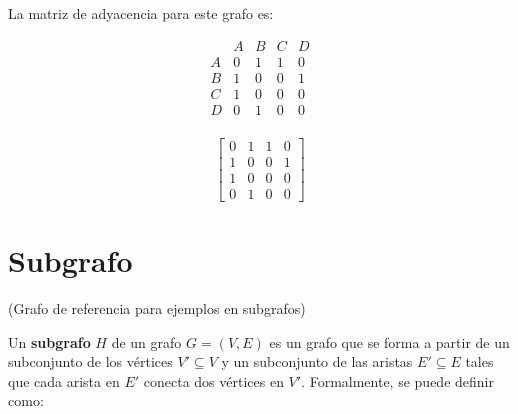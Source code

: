 \documentclass{article}
\begin{document}
La matriz de adyacencia para este grafo es:

$$\begin{array}{c|cccc}   & A & B & C & D \\ \hline A & 0 & 1 & 1 & 0 \\ B & 1 & 0 & 0 & 1 \\ C & 1 & 0 & 0 & 0 \\ D & 0 & 1 & 0 & 0 \\ \end{array}$$

$$
\begin{bmatrix}
0 & 1 & 1 & 0 \\
1 & 0 & 0 & 1 \\
1 & 0 & 0 & 0 \\
0 & 1 & 0 & 0
\end{bmatrix}
$$

\begin{center}
\end{center}

\section{Subgrafo}

\begin{center}
(Grafo de referencia para ejemplos en subgrafos)
\end{center}

Un \textbf{subgrafo} $ H $ de un grafo $ G = (V, E) $ es un grafo que se forma a partir de un subconjunto de los vértices $ V' \subseteq V $ y un subconjunto de las aristas $ E' \subseteq E $ tales que cada arista en $ E' $ conecta dos vértices en $ V' $. Formalmente, se puede definir como:
\end{document}
